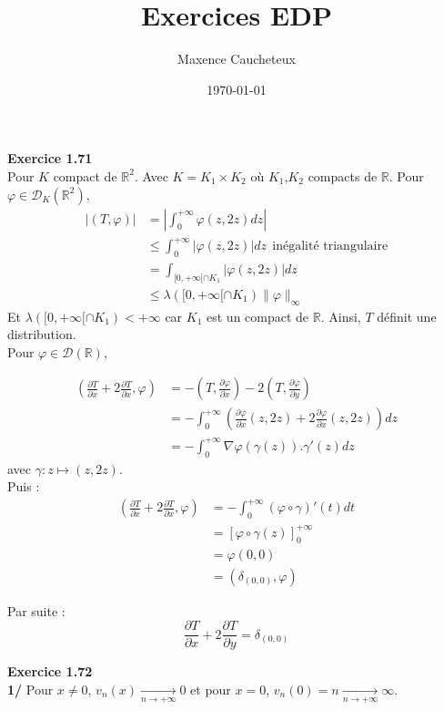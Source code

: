\documentclass[a4paper,12pt]{article}
\title{Exercices EDP}
\author{Maxence Caucheteux}
\date{\today}
\begin{document}
\maketitle

\textbf{Exercice 1.71} \\
Pour $K$ compact de $\mathbb{R}^2$. Avec $K=K_1 \times K_2$ où $K_1$,$K_2$ compacts de $\mathbb{R}$. Pour $\varphi \in \mathcal{D}_{K}(\mathbb{R}^2)$,
\begin{align*}
    |(T, \varphi)| & = \left| \int_{0}^{+ \infty} \varphi(z,2z) dz \right| \\
         & \leq  \int_{0}^{+ \infty} |\varphi(z,2z)| dz \ \ \text{inégalité triangulaire} \\
         & = \int_{[0, +\infty[ \cap K_1} |\varphi(z,2z)|dz \\
         & \boxed{\leq \lambda([0,+ \infty[ \cap K_1) \| \varphi \|_{\infty}}
\end{align*}
Et $\lambda([0,+ \infty[ \cap K_1) < + \infty$ car $K_1$ est un compact de $\mathbb{R}$. Ainsi, $T$ définit une distribution. \\

Pour $\varphi \in \mathcal{D}(\mathbb{R})$,

\begin{align*}
    (\frac{\partial T}{ \partial x} + 2\frac{\partial T}{ \partial x} , \varphi) & = -(T, \frac{\partial \varphi}{\partial x})-2(T, \frac{\partial \varphi}{\partial y}) \\
    & = -\int_{0}^{+ \infty} (\frac{\partial \varphi}{\partial x} (z,2z) + 2 \frac{\partial \varphi}{\partial x}(z,2z)) dz \\
    & = - \int_{0}^{+ \infty} \nabla \varphi(\gamma(z)).\gamma ' (z) dz
\end{align*}
avec $\gamma : z \mapsto (z, 2z)$. \\
Puis :
\begin{align*}
    (\frac{\partial T}{ \partial x} + 2\frac{\partial T}{ \partial x} , \varphi) & = - \int_{0}^{+ \infty} (\varphi \circ \gamma) ' (t) dt \\
    			& = [\varphi \circ \gamma(z)]_{0}^{+ \infty} \\
    			& = \varphi(0,0) \\
    			& \boxed{= (\delta_{(0,0)}, \varphi)}
\end{align*}

Par suite :
$$\boxed{\frac{\partial T}{\partial x} + 2 \frac{\partial T}{\partial y} = \delta_{(0,0)}}$$


\textbf{Exercice 1.72} \\
\textbf{1/} Pour $x \neq 0$, $v_n(x) \underset{n\to+\infty}{\longrightarrow} 0$ et pour $x=0$, $v_n(0)=n \underset{n\to+\infty}{\longrightarrow} \infty$. \\
\end{document}
